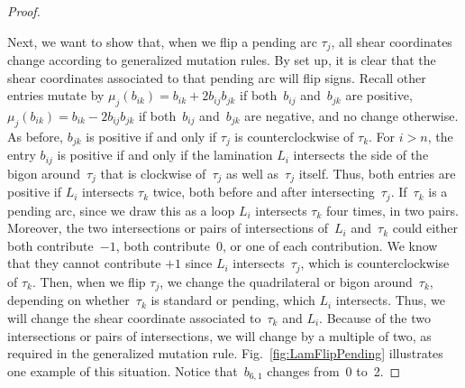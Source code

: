 \begin{proof}
\begin{center}
\end{center}

Next, we want to show that, when we flip a pending arc $\tau_j$, all shear coordinates change according to generalized mutation rules. By set up, it is clear that the shear coordinates associated to that pending arc will flip signs. Recall other entries mutate by $\mu_j(b_{ik}) = b_{ik} + 2 b_{ij} b_{jk}$ if both~$b_{ij}$ and~$b_{jk}$ are positive, $\mu_j(b_{ik}) = b_{ik} - 2 b_{ij} b_{jk}$ if both~$b_{ij}$ and~$b_{jk}$ are negative, and no change otherwise. As before, $b_{jk}$ is positive if and only if $\tau_j$ is counterclockwise of $\tau_k$. For $i > n$, the entry $b_{ij}$ is positive if and only if the lamination $L_i$ intersects the side of the bigon around~$\tau_j$ that is clockwise of~$\tau_j$ as well as~$\tau_j$ itself. Thus, both entries are positive if $L_i$ intersects $\tau_k$ twice, both before and after intersecting~$\tau_j$. If~$\tau_k$ is a pending arc, since we draw this as a loop $L_i$ intersects $\tau_k$ four times, in two pairs. Moreover, the two intersections or pairs of intersections of~$L_i$ and~$\tau_k$ could either both contribute~$-1$, both contribute~0, or one of each contribution. We know that they cannot contribute $+1$ since $L_i$ intersects~$\tau_j$, which is counterclockwise of $\tau_k$. Then, when we flip $\tau_j$, we change the quadrilateral or bigon around~$\tau_k$, depending on whether~$\tau_k$ is standard or pending, which $L_i$ intersects. Thus, we will change the shear coordinate associated to~$\tau_k$ and $L_i$. Because of the two intersections or pairs of intersections, we will change by a multiple of two, as required in the generalized mutation rule.
Fig.~\ref{fig:LamFlipPending} illustrates one example of this situation. Notice that~$b_{6,1}$ changes from~0 to~2.
\end{proof}

